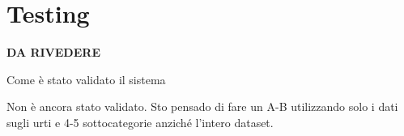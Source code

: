 \chapter{Testing}
\label{sec:testing}

\textbf{DA RIVEDERE}

Come è stato validato il sistema

Non è ancora stato validato.
Sto pensado di fare un A-B utilizzando solo i dati sugli urti e 4-5 sottocategorie anziché l'intero dataset.
